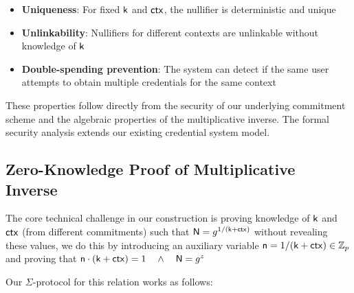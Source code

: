 \begin{itemize}
    \item \textbf{Uniqueness}: For fixed $\mathsf{k}$ and $\mathsf{ctx}$, the nullifier is deterministic and unique
    \item \textbf{Unlinkability}: Nullifiers for different contexts are unlinkable without knowledge of $\mathsf{k}$
    \item \textbf{Double-spending prevention}: The system can detect if the same user attempts to obtain multiple credentials for the same context
\end{itemize}

These properties follow directly from the security of our underlying commitment scheme and the algebraic properties of the multiplicative inverse. The formal security analysis extends our existing credential system model.



\subsection{Zero-Knowledge Proof of Multiplicative Inverse}
The core technical challenge in our construction is proving knowledge of $\mathsf{k}$ and $\mathsf{ctx}$ (from different commitments) such that $\mathsf{N} = g^{1/(\mathsf{k} + \mathsf{ctx})}$ without revealing these values, we do this by introducing an auxiliary variable $\mathsf{n} = 1/(\mathsf{k} + \mathsf{ctx}) \in \mathbb{Z}_p$ and proving that $\mathsf{n} \cdot (\mathsf{k} + \mathsf{ctx}) = 1 \quad \wedge \quad \mathsf{N} = g^z$

Our $\Sigma$-protocol for this relation works as follows:

